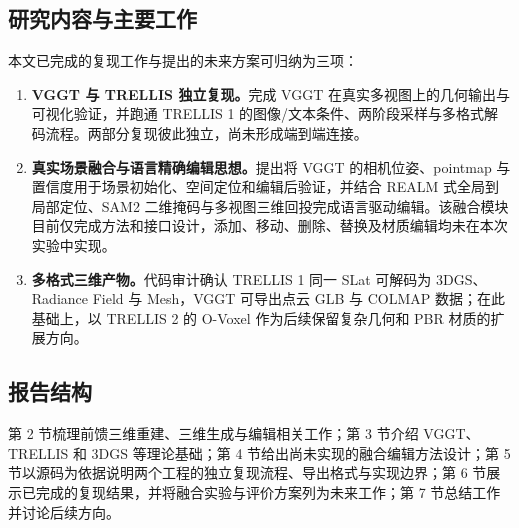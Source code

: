 \subsection{研究内容与主要工作}

本文已完成的复现工作与提出的未来方案可归纳为三项：

\begin{enumerate}[label=\arabic*.]
  \item \textbf{VGGT 与 TRELLIS 独立复现。}完成 VGGT 在真实多视图上的几何输出与可视化验证，并跑通 TRELLIS 1 的图像/文本条件、两阶段采样与多格式解码流程。两部分复现彼此独立，尚未形成端到端连接。
  \item \textbf{真实场景融合与语言精确编辑思想。}提出将 VGGT 的相机位姿、pointmap 与置信度用于场景初始化、空间定位和编辑后验证，并结合 REALM 式全局到局部定位、SAM2 二维掩码与多视图三维回投完成语言驱动编辑。该融合模块目前仅完成方法和接口设计，添加、移动、删除、替换及材质编辑均未在本次实验中实现。
  \item \textbf{多格式三维产物。}代码审计确认 TRELLIS 1 同一 SLat 可解码为 3DGS、Radiance Field 与 Mesh，VGGT 可导出点云 GLB 与 COLMAP 数据；在此基础上，以 TRELLIS 2 的 O-Voxel 作为后续保留复杂几何和 PBR 材质的扩展方向。
\end{enumerate}

\subsection{报告结构}

第 2 节梳理前馈三维重建、三维生成与编辑相关工作；第 3 节介绍 VGGT、TRELLIS 和 3DGS 等理论基础；第 4 节给出尚未实现的融合编辑方法设计；第 5 节以源码为依据说明两个工程的独立复现流程、导出格式与实现边界；第 6 节展示已完成的复现结果，并将融合实验与评价方案列为未来工作；第 7 节总结工作并讨论后续方向。
